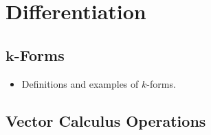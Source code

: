 \documentclass[../notes.tex]{subfiles}
\begin{document}
\chapter{Differentiation}
\section[\texorpdfstring{$k$}{TEXT}-Forms]{\texorpdfstring{$\bm{k}$}{TEXT}-Forms}
\begin{itemize}
    \item {}Definitions and examples of $k$-forms.
\end{itemize}



\section{Vector Calculus Operations}
\end{document}
